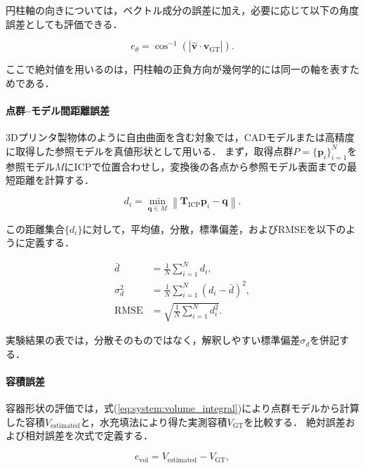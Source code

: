 円柱軸の向きについては，ベクトル成分の誤差に加え，必要に応じて以下の角度誤差としても評価できる．

\begin{equation}
  e_{\theta}=\cos^{-1}\left(\left|\hat{\bm{v}}\cdot\bm{v}_{\mathrm{GT}}\right|\right).
  \label{eq:system:axis_angle_error}
\end{equation}

ここで絶対値を用いるのは，円柱軸の正負方向が幾何学的には同一の軸を表すためである．

\paragraph{点群--モデル間距離誤差}

3Dプリンタ製物体のように自由曲面を含む対象では，CADモデルまたは高精度に取得した参照モデルを真値形状として用いる．
まず，取得点群$P=\{\bm{p}_i\}_{i=1}^{N}$を参照モデル$M$にICPで位置合わせし，変換後の各点から参照モデル表面までの最短距離を計算する．

\begin{equation}
  d_i=\min_{\bm{q}\in M}\left\|\bm{T}_{\mathrm{ICP}}\bm{p}_i-\bm{q}\right\|.
  \label{eq:system:point_to_model_distance}
\end{equation}

この距離集合$\{d_i\}$に対して，平均値，分散，標準偏差，およびRMSEを以下のように定義する．

\begin{align}
  \bar{d} &= \frac{1}{N}\sum_{i=1}^{N}d_i, \\
  \sigma_d^2 &= \frac{1}{N}\sum_{i=1}^{N}(d_i-\bar{d})^2, \\
  \mathrm{RMSE} &= \sqrt{\frac{1}{N}\sum_{i=1}^{N}d_i^2}.
  \label{eq:system:distance_statistics}
\end{align}

実験結果の表では，分散そのものではなく，解釈しやすい標準偏差$\sigma_d$を併記する．

\paragraph{容積誤差}

容器形状の評価では，式(\ref{eq:system:volume_integral})により点群モデルから計算した容積$V_{\mathrm{estimated}}$と，水充填法により得た実測容積$V_{\mathrm{GT}}$を比較する．
絶対誤差および相対誤差を次式で定義する．

\begin{equation}
  e_{\mathrm{vol}} = V_{\mathrm{estimated}}-V_{\mathrm{GT}},
  \label{eq:system:vol_error}
\end{equation}

